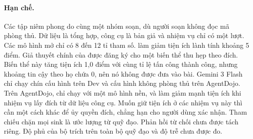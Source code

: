 \paragraph{Hạn chế.} Các tập niêm phong do cùng một nhóm soạn, dù người soạn không đọc mã phòng thủ. Dữ liệu là tổng
hợp, công cụ là bản giả và nhiệm vụ chỉ có một lượt. Các mô hình mở chỉ có 8 đến 12 tỉ tham số. \ours{} làm giảm tiện
ích lành tính khoảng 5 điểm. Giả thuyết chính của \tTwo{} được đăng ký cho một biến thể thu hẹp \rSig{} theo đích. Biến
thể này tăng tiện ích 1,0 điểm với cùng tỉ lệ tấn công thành công, nhưng khoảng tin cậy theo họ chứa 0, nên nó không
được đưa vào bài. Gemini 3 Flash chỉ chạy chín cấu hình trên Dev và cấu hình không phòng thủ trên AgentDojo. Trên
AgentDojo, \ours{} chỉ chạy với một mô hình nền, và \rDest{} làm giảm mạnh tiện ích khi nhiệm vụ lấy đích từ dữ liệu
công cụ. Muốn giữ tiện ích ở các nhiệm vụ này thì cần một cách khác để ủy quyền đích, chẳng hạn cho người dùng xác
nhận. Tham chiếu chặn mọi sink là ước lượng từ quỹ đạo. Phản hồi từ chối chưa được tách riêng. Độ phủ của
bộ trích trên toàn bộ quỹ đạo và độ trễ chưa được đo.
